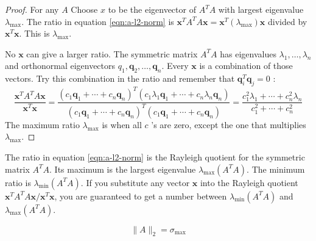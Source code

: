 \begin{proof}
    For any $A$ Choose $x$ to be the eigenvector of $A^{{T}} A$ with largest eigenvalue $\lambda_{\max } .$ The ratio in equation \ref{eqn:a-l2-norm} is $\boldsymbol{x}^{{T}} A^{{T}} A \boldsymbol{x}=\boldsymbol{x}^{{T}}\left(\lambda_{\max }\right) \boldsymbol{x}$ divided by $\boldsymbol{x}^{{T}} \boldsymbol{x}$. This is $\lambda_{\max }$.

No $\boldsymbol{x}$ can give a larger ratio. The symmetric matrix $A^{{T}} A$ has eigenvalues $\lambda_{1}, \ldots, \lambda_{n}$ and orthonormal eigenvectors $q_{1}, \boldsymbol{q}_{2}, \ldots, \boldsymbol{q}_{n} .$ Every $\boldsymbol{x}$ is a combination of those vectors. Try this combination in the ratio and remember that $\boldsymbol{q}_{i}^{{T}} \boldsymbol{q}_{j}=0$ :
\begin{equation}
\frac{\boldsymbol{x}^{{T}} A^{{T}} A \boldsymbol{x}}{\boldsymbol{x}^{{T}} \boldsymbol{x}}=\frac{\left(c_{1} \boldsymbol{q}_{1}+\cdots+c_{n} \boldsymbol{q}_{n}\right)^{{T}}\left(c_{1} \lambda_{1} \boldsymbol{q}_{1}+\cdots+c_{n} \lambda_{n} \boldsymbol{q}_{n}\right)}{\left(c_{1} \boldsymbol{q}_{1}+\cdots+c_{n} \boldsymbol{q}_{n}\right)^{{T}}\left(c_{1} \boldsymbol{q}_{1}+\cdots+c_{n} \boldsymbol{q}_{n}\right)}=\frac{c_{1}^{2} \lambda_{1}+\cdots+c_{n}^{2} \lambda_{n}}{c_{1}^{2}+\cdots+c_{n}^{2}}
\end{equation}
The maximum ratio $\lambda_{\max }$ is when all $c$ 's are zero, except the one that multiplies $\lambda_{\max }$.
\end{proof}

\begin{remark}
    The ratio in equation \ref{eqn:a-l2-norm} is the Rayleigh quotient for the symmetric matrix $A^{{T}} A$. Its maximum is the largest eigenvalue $\lambda_{\max }\left(A^{{T}} A\right) .$ The minimum ratio is $\lambda_{\min }\left(A^{{T}} A\right)$. If you substitute any vector $\boldsymbol{x}$ into the Rayleigh quotient $\boldsymbol{x}^{{T}} A^{{T}} A \boldsymbol{x} / \boldsymbol{x}^{{T}} \boldsymbol{x}$, you are guaranteed to get a number between $\lambda_{\min }\left(A^{{T}} A\right)$ and $\lambda_{\max }\left(A^{{T}} A\right)$.
\end{remark}

\begin{corollary}
    \begin{equation}\|A\|_{2}= \sigma_{\max} \end{equation}
\end{corollary}

